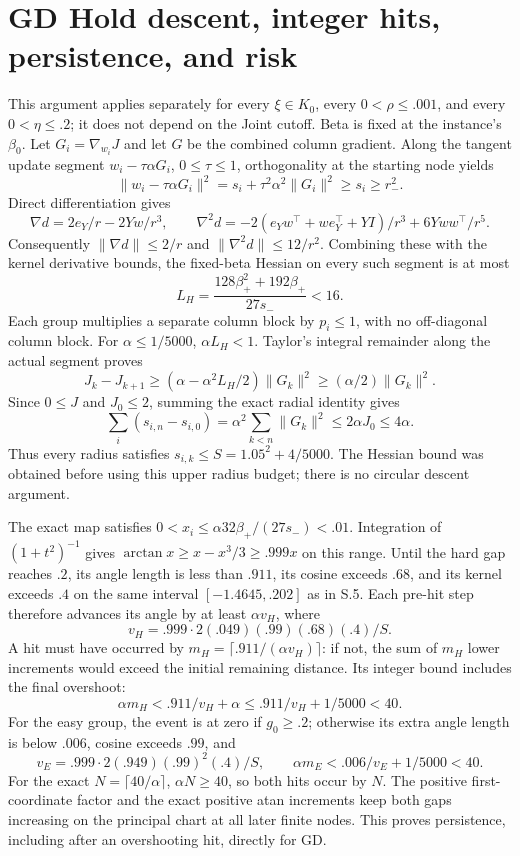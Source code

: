 \documentclass[11pt,a4paper]{article}
\begin{document}
\section{GD Hold descent, integer hits, persistence, and risk}

This argument applies separately for every $\xi\in K_0$, every $0<\rho\le.001$, and every $0<\eta\le.2$; it does not depend on the Joint cutoff. Beta is fixed at the instance's $\beta_0$. Let $G_i=\nabla_{w_i}J$ and let $G$ be the combined column gradient. Along the tangent update segment $w_i-\tau\alpha G_i$, $0\le\tau\le1$, orthogonality at the starting node yields
\[
 \|w_i-\tau\alpha G_i\|^2=s_i+\tau^2\alpha^2\|G_i\|^2\ge s_i\ge r_-^2 .
\]
Direct differentiation gives
\[
 \nabla d=2e_Y/r-2Yw/r^3,\qquad
 \nabla^2d=-2(e_Yw^\top+we_Y^\top+YI)/r^3+6Yww^\top/r^5 .
\]
Consequently $\|\nabla d\|\le2/r$ and $\|\nabla^2d\|\le12/r^2$. Combining these with the kernel derivative bounds, the fixed-beta Hessian on every such segment is at most
\[
 L_H=\frac{128\beta_+^2+192\beta_+}{27s_-}<16 .
\]
Each group multiplies a separate column block by $p_i\le1$, with no off-diagonal column block. For $\alpha\le1/5000$, $\alpha L_H<1$. Taylor's integral remainder along the actual segment proves
\[
 J_k-J_{k+1}\ge(\alpha-\alpha^2L_H/2)\|G_k\|^2
 \ge(\alpha/2)\|G_k\|^2 .
\]
Since $0\le J$ and $J_0\le2$, summing the exact radial identity gives
\[
 \sum_i(s_{i,n}-s_{i,0})=\alpha^2\sum_{k<n}\|G_k\|^2
 \le2\alpha J_0\le4\alpha .
\]
Thus every radius satisfies $s_{i,k}\le S=1.05^2+4/5000$. The Hessian bound was obtained before using this upper radius budget; there is no circular descent argument.

The exact map satisfies $0<x_i\le\alpha32\beta_+/(27s_-)<.01$. Integration of $(1+t^2)^{-1}$ gives
$\arctan x\ge x-x^3/3\ge.999x$ on this range. Until the hard gap reaches $.2$, its angle length is less than $.911$, its cosine exceeds $.68$, and its kernel exceeds $.4$ on the same interval $[-1.4645,.202]$ as in S.5. Each pre-hit step therefore advances its angle by at least $\alpha v_H$, where
\[
 v_H=.999\cdot2(.049)(.99)(.68)(.4)/S .
\]
A hit must have occurred by $m_H=\lceil.911/(\alpha v_H)\rceil$: if not, the sum of $m_H$ lower increments would exceed the initial remaining distance. Its integer bound includes the final overshoot:
\[
 \alpha m_H<.911/v_H+\alpha\le.911/v_H+1/5000<40 .
\]
For the easy group, the event is at zero if $g_0\ge.2$; otherwise its extra angle length is below $.006$, cosine exceeds $.99$, and
\[
 v_E=.999\cdot2(.949)(.99)^2(.4)/S,\qquad
 \alpha m_E<.006/v_E+1/5000<40 .
\]
For the exact $N=\lceil40/\alpha\rceil$, $\alpha N\ge40$, so both hits occur by $N$. The positive first-coordinate factor and the exact positive atan increments keep both gaps increasing on the principal chart at all later finite nodes. This proves persistence, including after an overshooting hit, directly for GD.
\end{document}
